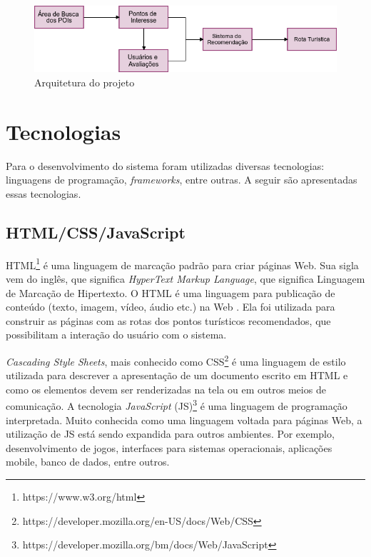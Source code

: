 \begin{figure}[H]
    \centering
    \includegraphics[width=\textwidth]{images/Tourisys_Pipe_Filter.png}
    \caption{Arquitetura do projeto}
    \label{fig:Tourisys_pipe_filter}
\end{figure}

\section{Tecnologias}
\label{sec:technologies}

Para o desenvolvimento do sistema foram utilizadas diversas tecnologias: linguagens de programação, \textit{frameworks}, entre outras. A seguir são apresentadas essas tecnologias.

\subsection{HTML/CSS/JavaScript}

HTML\footnote{https://www.w3.org/html} é uma linguagem de marcação padrão para criar páginas Web. Sua sigla vem do inglês, que significa \textit{HyperText Markup Language}, que significa Linguagem de Marcação de Hipertexto. O HTML é uma linguagem para publicação de conteúdo (texto, imagem, vídeo, áudio etc.) na Web \citep{w3cHTML}. Ela foi utilizada para construir as páginas com as rotas dos pontos turísticos recomendados, que possibilitam a interação do usuário com o sistema.

\textit{Cascading Style Sheets}, mais conhecido como CSS\footnote{https://developer.mozilla.org/en-US/docs/Web/CSS} é uma linguagem de estilo utilizada para descrever a apresentação de um documento escrito em HTML e como os elementos devem ser renderizadas na tela ou em outros meios de comunicação. A tecnologia \textit{JavaScript} (JS)\footnote{https://developer.mozilla.org/bm/docs/Web/JavaScript} é uma linguagem de programação interpretada. Muito conhecida como uma linguagem voltada para páginas Web, a utilização de JS está sendo expandida para outros ambientes. Por exemplo, desenvolvimento de jogos, interfaces para sistemas operacionais, aplicações mobile, banco de dados, entre outros.

